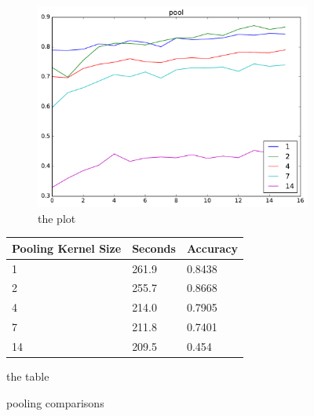 \documentclass{article}
\begin{document}
\begin{enumerate}
\begin{item}
		\begin{figure}[h]
			\centering	
			\begin{subfigure}[b]{0.45\textwidth}
				\includegraphics[width=\textwidth]{figures/poolcpu}
				\caption{the plot}
				\label{fig:pooling_cpu}
			\end{subfigure}	
			\quad
			\begin{subtable}[b]{0.4\textwidth}
				\begin{tabular}{lll}
					\toprule
					Pooling Kernel Size     & Seconds & Accuracy \\
					\midrule
					1 & 261.9 & 0.8438 \\
					2 & 255.7 & 0.8668 \\
					4 & 214.0 & 0.7905 \\
					7 & 211.8 & 0.7401 \\
					14 & 209.5 & 0.454 \\
					\bottomrule
				\end{tabular}
				\caption{the table}
				\label{pooling_comp_table}
			\end{subtable}	
			\caption{pooling comparisons}
			\label{pooling_comparisons}
		\end{figure}
	\end{item}

	
\end{enumerate}
\end{document}
